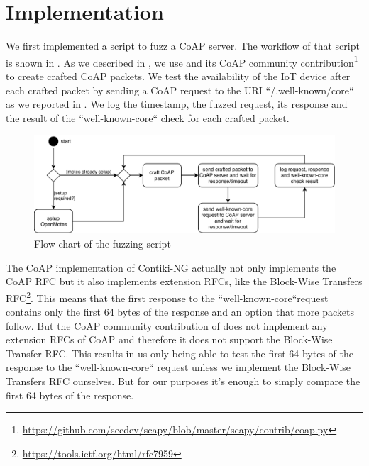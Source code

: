 \section{Implementation}
\label{section:implementation}


We first implemented a script to fuzz a CoAP server. The workflow of that script is shown in . As we described in , we use \scapy and its CoAP community contribution\footnote{\url{https://github.com/secdev/scapy/blob/master/scapy/contrib/coap.py}} to create crafted CoAP packets. We test the availability of the IoT device after each crafted packet by sending a CoAP request to the URI ``/.well-known/core`` as we reported in . We log the timestamp, the fuzzed request, its response and the result of the ``well-known-core`` check for each crafted packet.

\begin{figure}
	\centering
	\includegraphics[width=\textwidth]{images/fuzzing_flow_chart}
	\caption{Flow chart of the fuzzing script}
	\label{figure:fuzz_flow_chart}
\end{figure}

The CoAP implementation of Contiki-NG actually not only implements the CoAP RFC but it also implements extension RFCs, like the Block-Wise Transfers RFC\footnote{\url{https://tools.ietf.org/html/rfc7959}}. This means that the first response to the ``well-known-core``request contains only the first 64 bytes of the response and an option that more packets follow. But the CoAP community contribution of \scapy does not implement any extension RFCs of CoAP and therefore it does not support the Block-Wise Transfer RFC. This results in us only being able to test the first 64 bytes of the response to the ``well-known-core`` request unless we implement the Block-Wise Transfers RFC ourselves. But for our purposes it's enough to simply compare the first 64 bytes of the response.

